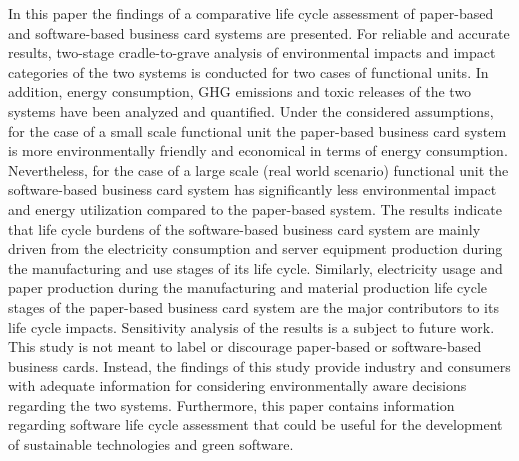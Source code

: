 \documentclass[3p,times,procedia]{elsarticle}
\begin{document}
In this paper the findings of a comparative life cycle assessment of paper-based and software-based business card systems are presented. For reliable and accurate results, two-stage cradle-to-grave analysis of environmental impacts and impact categories of the two systems is conducted for two cases of functional units. In addition, energy consumption, GHG emissions and toxic releases of the two systems have been analyzed and quantified. Under the considered assumptions, for the case of a small scale functional unit the paper-based business card system is more environmentally friendly and economical in terms of energy consumption. Nevertheless, for the case of a large scale (real world scenario) functional unit the software-based business card system has significantly less environmental impact and energy utilization compared to the paper-based system. The results indicate that life cycle burdens of the software-based business card system are mainly driven from
the electricity consumption and server equipment production during the manufacturing and use stages of its life cycle. Similarly, electricity usage and paper production during the manufacturing and material production life cycle stages of the paper-based business card system are the major contributors to its life cycle impacts. Sensitivity analysis of the results is a subject to future work. This study is not meant to label or discourage paper-based or software-based business cards. Instead, the findings of this study provide industry and consumers with adequate information for considering environmentally aware decisions regarding the two systems. Furthermore, this paper contains information regarding software life cycle assessment that could be useful for the development of sustainable technologies and green software. 




\end{document}
